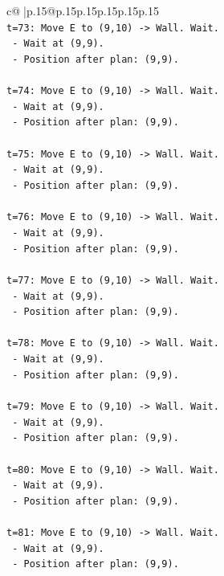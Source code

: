 \documentclass{article}
\begin{document}
{\begin{supertabular}{c@{$\;$}|p{.15\linewidth}@{}p{.15\linewidth}p{.15\linewidth}p{.15\linewidth}p{.15\linewidth}p{.15\linewidth}}
{{{\\ 
\texttt{t=73: Move E to (9,10) {-}> Wall. Wait.} \\
\texttt{   {-} Wait at (9,9).} \\
\texttt{   {-} Position after plan: (9,9).} \\
\\ 
\texttt{t=74: Move E to (9,10) {-}> Wall. Wait.} \\
\texttt{   {-} Wait at (9,9).} \\
\texttt{   {-} Position after plan: (9,9).} \\
\\ 
\texttt{t=75: Move E to (9,10) {-}> Wall. Wait.} \\
\texttt{   {-} Wait at (9,9).} \\
\texttt{   {-} Position after plan: (9,9).} \\
\\ 
\texttt{t=76: Move E to (9,10) {-}> Wall. Wait.} \\
\texttt{   {-} Wait at (9,9).} \\
\texttt{   {-} Position after plan: (9,9).} \\
\\ 
\texttt{t=77: Move E to (9,10) {-}> Wall. Wait.} \\
\texttt{   {-} Wait at (9,9).} \\
\texttt{   {-} Position after plan: (9,9).} \\
\\ 
\texttt{t=78: Move E to (9,10) {-}> Wall. Wait.} \\
\texttt{   {-} Wait at (9,9).} \\
\texttt{   {-} Position after plan: (9,9).} \\
\\ 
\texttt{t=79: Move E to (9,10) {-}> Wall. Wait.} \\
\texttt{   {-} Wait at (9,9).} \\
\texttt{   {-} Position after plan: (9,9).} \\
\\ 
\texttt{t=80: Move E to (9,10) {-}> Wall. Wait.} \\
\texttt{   {-} Wait at (9,9).} \\
\texttt{   {-} Position after plan: (9,9).} \\
\\ 
\texttt{t=81: Move E to (9,10) {-}> Wall. Wait.} \\
\texttt{   {-} Wait at (9,9).} \\
\texttt{   {-} Position after plan: (9,9).} \\
}}}
\end{supertabular}}
\end{document}
